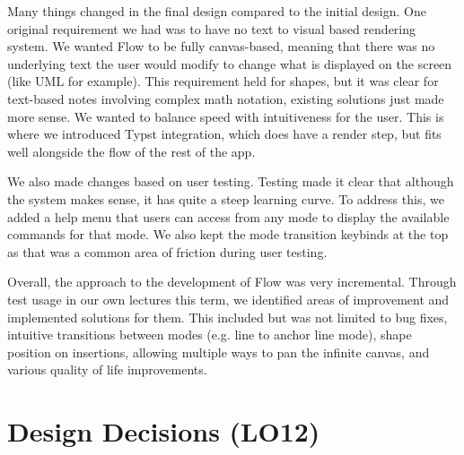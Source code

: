 \documentclass{article}
\begin{document}
%

Many things changed in the final design compared to the initial design. One
original requirement we had was to have no text to visual based rendering
system. We wanted Flow to be fully canvas-based, meaning that there was no
underlying text the user would modify to change what is displayed on the screen
(like UML for example). This requirement held for shapes, but it was clear for
text-based notes involving complex math notation, existing solutions just made
more sense. We wanted to balance speed with intuitiveness for the user. This is
where we introduced Typst integration, which does have a render step, but
fits well alongside the flow of the rest of the app.

We also made changes based on user testing. Testing made it clear that although
the system makes sense, it has quite a steep learning curve. To address this,
we added a help menu that users can access from any mode to display the
available commands for that mode. We also kept the mode transition keybinds at
the top as that was a common area of friction during user testing.

Overall, the approach to the development of Flow was very incremental. Through
test usage in our own lectures this term, we identified areas of improvement
and implemented solutions for them. This included but was not limited to bug
fixes, intuitive transitions between modes (e.g. line to anchor line mode),
shape position on insertions, allowing multiple ways to pan the infinite
canvas, and various quality of life improvements.

\section{Design Decisions (LO12)}
\end{document}
